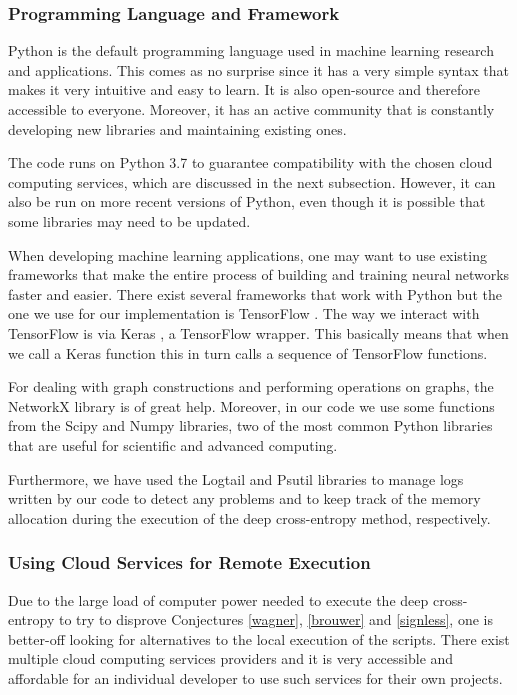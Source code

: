 \documentclass[11pt]{article}
\theoremstyle{definition}
\begin{document}
\subsubsection{Programming Language and Framework}

Python is the default programming language used in machine learning research and applications. This comes as no surprise since it has a very simple syntax that makes it very intuitive and easy to learn. It is also open-source and therefore accessible to everyone. Moreover, it has an active community that is constantly developing new libraries and maintaining existing ones. 

The code runs on Python 3.7 to guarantee compatibility with the chosen cloud computing services, which are discussed in the next subsection. However, it can also be run on more recent versions of Python, even though it is possible that some libraries may need to be updated. 

When developing machine learning applications, one may want to use existing frameworks that make the entire process of building and training neural networks faster and easier. There exist several frameworks that work with Python but the one we use for our implementation is TensorFlow \cite{tensorflow}. The way we interact with TensorFlow is via Keras \cite{chollet2015keras}, a TensorFlow wrapper. This basically means that when we call a Keras function this in turn calls a sequence of TensorFlow functions. 

For dealing with graph constructions and performing operations on graphs, the NetworkX library \cite{hagberg2008exploring} is of great help. Moreover, in our code we use some functions from the Scipy \cite{2020SciPy-NMeth} and Numpy \cite{harris2020array} libraries, two of the most common Python libraries that are useful for scientific and advanced computing. 

Furthermore, we have used the Logtail \cite{logtail} and Psutil \cite{psutil} libraries to manage logs written by our code to detect any problems and to keep track of the memory allocation during the execution of the deep cross-entropy method, respectively.

\subsubsection{Using Cloud Services for Remote Execution}

Due to the large load of computer power needed to execute the deep cross-entropy to try to disprove Conjectures \ref{wagner}, \ref{brouwer} and \ref{signless}, one is better-off looking for alternatives to the local execution of the scripts. There exist multiple cloud computing services providers and it is very accessible and affordable for an individual developer to use such services for their own projects. 
\end{document}
